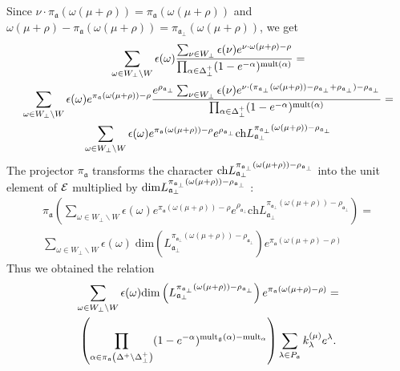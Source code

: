 \documentclass[a4paper,12pt]{article}
\theoremstyle{definition} \newtheorem{Def}{Definition}
\begin{document}
Since $\nu\cdot \pi_{\mathfrak{a}}(\omega(\mu+\rho))=\pi_{\mathfrak{a}}(\omega(\mu+\rho))$ and $\omega(\mu+\rho)-\pi_{\mathfrak{a}}(\omega(\mu+\rho))=\pi_{\mathfrak{a}_{\bot}}(\omega(\mu+\rho))$, we get
\begin{multline}
  \label{eq:14}
  \sum_{\omega\in W_{\bot}\backslash W} \epsilon(\omega) \frac{\sum_{\nu\in W_{\bot}}\epsilon(\nu) e^{\nu \cdot \omega(\mu+\rho)-\rho}}{\prod_{\alpha\in\Delta^{+}_{\bot}}(1-e^{-\alpha})^{\mathrm{mult}(\alpha)}} =\\
  \sum_{\omega\in W_{\bot}\backslash W} \epsilon(\omega) e^{\pi_{\mathfrak{a}}(\omega(\mu+\rho))-\rho} \frac{e^{\rho_{\mathfrak{a}_{\bot}} }\sum_{\nu\in W_{\bot}}\epsilon(\nu) e^{\nu \cdot (\pi_{\mathfrak{a}_{\bot}}(\omega(\mu+\rho))-\rho_{\mathfrak{a}_{\bot}}+\rho_{\mathfrak{a}_{\bot}})-\rho_{\mathfrak{a}_{\bot}}}}{\prod_{\alpha\in\Delta^{+}_{\bot}}(1-e^{-\alpha})^{\mathrm{mult}(\alpha)}}=\\
  \sum_{\omega\in W_{\bot}\backslash W} \epsilon(\omega) e^{\pi_{\mathfrak{a}}(\omega(\mu+\rho))-\rho}e^{\rho_{\mathfrak{a}_{\bot}}} {\rm ch} L^{\pi_{\mathfrak{a}_{\bot}}(\omega(\mu+\rho))-\rho_{\mathfrak{a}_{\bot}}}_{\mathfrak{a}_{\bot}}
\end{multline}
The projector $\pi_{\mathfrak{a}}$ transforms the character ${\rm ch}L^{\pi_{\mathfrak{a}_{\bot}}(\omega(\mu+\rho))-\rho_{\mathfrak{a}_{\bot}}}_{\mathfrak{a}_{\bot}}$ into the unit element of $\cal{E}$ multiplied by ${\rm dim}L^{\pi_{\mathfrak{a}_{\bot}}(\omega(\mu+\rho))-\rho_{\mathfrak{a}_{\bot}}}_{\mathfrak{a}_{\bot}}$  :
  \begin{multline}
    \label{eq:15}
    \pi_{\mathfrak{a}}\left( \sum_{\omega\in W_{\bot}\backslash W} \epsilon(\omega) e^{\pi_{\mathfrak{a}}(\omega(\mu+\rho))-\rho}e^{\rho_{\mathfrak{a}_{\bot}}} \mathrm{ch} L^{\pi_{\mathfrak{a}_{\bot}}(\omega(\mu+\rho))-\rho_{\mathfrak{a}_{\bot}}}_{\mathfrak{a}_{\bot}}\right) = \\
    \sum_{\omega\in W_{\bot}\backslash W} \epsilon(\omega)\; \mathrm{dim}\left(L^{\pi_{\mathfrak{a}_{\bot}}(\omega(\mu+\rho))-\rho_{\mathfrak{a}_{\bot}}}_{\mathfrak{a}_{\bot}}\right) e^{\pi_{\mathfrak{a}}(\omega(\mu+\rho)-\rho)}
  \end{multline}
Thus we obtained  the relation
\begin{multline}
  \label{eq:9}
  \sum_{\omega\in W_{\bot}\backslash W} \epsilon(\omega) \mathrm{dim}\left(L^{\pi_{\mathfrak{a}_{\bot}}(\omega(\mu+\rho))-\rho_{\mathfrak{a}_{\bot}}}_{\mathfrak{a}_{\bot}}\right) e^{\pi_{\mathfrak{a}}(\omega(\mu+\rho)-\rho)}=\\
  \left(\prod_{\alpha\in \pi_{\mathfrak{a}}\left(\Delta^{+}\setminus \Delta^{+}_{\bot}\right)}(1-e^{-\alpha})^{{\rm mult}_{\mathfrak{g}}(\alpha)-{\rm mult}_{\mathfrak{\alpha}}} \right)
  \sum_{\lambda \in P_{\frak{a}}}k_{\lambda}^{\left( \mu \right) }e^{\lambda }.
\end{multline}
\end{document}
